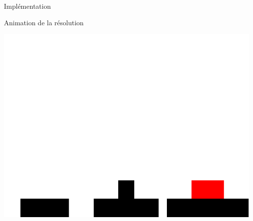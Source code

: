 \documentclass[usenames,dvipsnames,serif,14pt]{beamer}%
\begin{document}
\begin{frame}{Implémentation}
  \begin{block}{Animation de la résolution}
    \begin{center}
    \includegraphics[scale=0.2]{anim_hanoi.png}
    \end{center}
  \end{block}
\end{frame}
\end{document}
